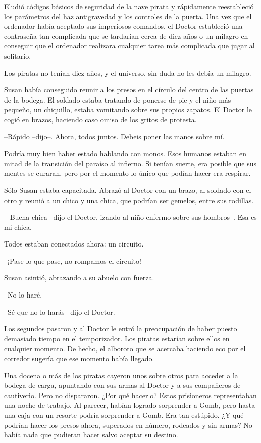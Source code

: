 Eludió códigos básicos de seguridad de la nave pirata y rápidamente reestableció los parámetros del haz antigravedad y los controles de la puerta. Una vez que el ordenador había aceptado sus imperiosos comandos, el Doctor estableció una contraseña tan complicada que se tardarían cerca de diez años o un milagro en conseguir que el ordenador realizara cualquier tarea más complicada que jugar al solitario.

Los piratas no tenían diez años, y el universo, sin duda no les debía un milagro.

Susan había conseguido reunir a los presos en el círculo del centro de las puertas de la bodega. El soldado estaba tratando de ponerse de pie y el niño más pequeño, un chiquillo, estaba vomitando sobre sus propios zapatos. El Doctor le cogió en brazos, haciendo caso omiso de los gritos de protesta.

--Rápido --dijo--. Ahora, todos juntos. Debeis poner las manos sobre mí.

Podría muy bien haber estado hablando con monos. Esos humanos estaban en mitad de la transición del paraíso al infierno. Si tenían suerte, era posible que sus mentes se curaran, pero por el momento lo único que podían hacer era respirar.

Sólo Susan estaba capacitada. Abrazó al Doctor con un brazo, al soldado con el otro y reunió a un chico y una chica, que podrían ser gemelos, entre sus rodillas.

-- Buena chica --dijo el Doctor, izando al niño enfermo sobre sus hombros--. Esa es mi chica. 

Todos estaban conectados ahora: un circuito.

--¡Pase lo que pase, no rompamos el circuito!

Susan asintió, abrazando a su abuelo con fuerza. 

--No lo haré.

--Sé que no lo harás --dijo el Doctor.

Los segundos pasaron y al Doctor le entró la preocupación de haber puesto demasiado tiempo en el temporizador. Los piratas estarían sobre ellos en cualquier momento. De hecho, el alboroto que se acercaba haciendo eco por el corredor sugería que ese momento había llegado.

Una docena o más de los piratas cayeron unos sobre otros para acceder a la bodega de carga, apuntando con sus armas al Doctor y a sus compañeros de cautiverio. Pero no dispararon. ¿Por qué hacerlo? Estos prisioneros representaban una noche de trabajo. Al parecer, habían logrado sorprender a Gomb, pero hasta una caja con un resorte podría sorprender a Gomb. Era tan estúpido. ¿Y qué podrían hacer los presos ahora, superados en número, rodeados y sin armas? No había nada que pudieran hacer salvo aceptar su destino.

